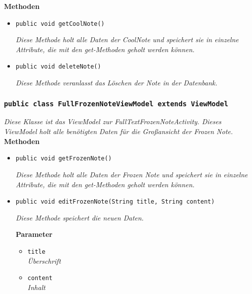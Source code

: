 		\textbf{Methoden}
 			\begin{itemize}
        		\item\texttt{public void getCoolNote()}
        	
        		\textit{Diese Methode holt alle Daten der CoolNote und speichert sie in einzelne Attribute, die mit den get-Methoden geholt werden können.}
        
               	\item\texttt{{public void deleteNote()}}
        	
        		\textit{Diese Methode veranlasst das Löschen der Note in der Datenbank.}

       		 \end{itemize}
             
             
                 \subsubsection{\texttt{public class FullFrozenNoteViewModel extends ViewModel}}
        \textit{Diese Klasse ist das ViewModel zur FullTextFrozenNoteActivity. Dieses ViewModel holt alle benötigten Daten für die Großansicht der Frozen Note.}\\
        
		\textbf{Methoden}
 			\begin{itemize}
        		\item\texttt{{public void getFrozenNote()}}
        	
        		\textit{Diese Methode holt alle Daten der Frozen Note und speichert sie in einzelne Attribute, die mit den get-Methoden geholt werden können.}
        		
        		\item\texttt{{public void editFrozenNote(String title, String content)}}
        	
        		\textit{Diese Methode speichert die neuen Daten.}
        		
        	
        	\textbf{Parameter}
        	\begin{itemize}
        		\item\texttt{title}\\
				\textit{Überschrift}
				\item\texttt{content}\\
				\textit{Inhalt}
			\end{itemize}
		
		\end{itemize}
       		 
